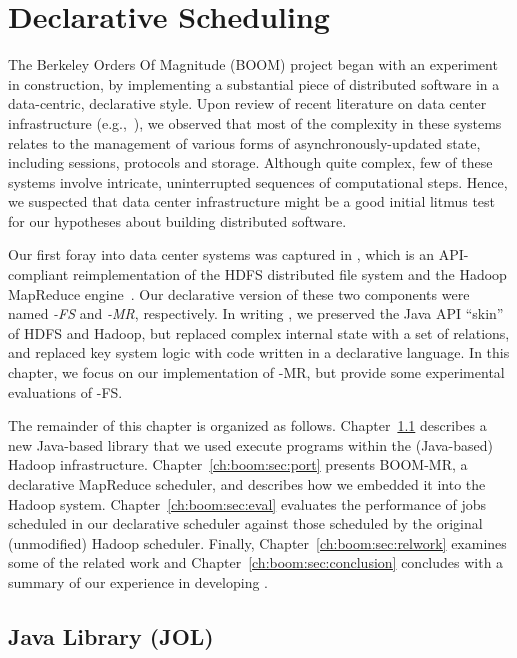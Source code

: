 \chapter[Declarative Scheduling]{Declarative Scheduling}
\label{ch:boom}

The Berkeley Orders Of Magnitude (BOOM) project began with an experiment in
construction, by implementing a substantial piece of distributed software in a
data-centric, declarative style.  Upon review of recent literature on
data center infrastructure (e.g.,~\cite{chubby,gfs-sosp,dynamo,mapreduce-osdi}),
we observed that most of the complexity in these systems relates to the
management of various forms of asynchronously-updated state, including
sessions, protocols and storage.  Although quite complex, few of these systems
involve intricate, uninterrupted sequences of computational steps.  Hence, we
suspected that data center infrastructure might be a good initial litmus test
for our hypotheses about building distributed software.

Our first foray into data center systems was captured in \emph{\BOOMA}, which
is an API-compliant reimplementation of the HDFS distributed file system and
the Hadoop MapReduce engine~\cite{boom}.  Our declarative version of these two
components were named \emph{\BOOM-FS} and \emph{\BOOM-MR}, respectively.  In
writing \BOOMA, we preserved the Java API ``skin'' of HDFS and Hadoop, but
replaced complex internal state with a set of relations, and replaced key
system logic with code written in a declarative language.  In this chapter, we
focus on our implementation of \BOOM-MR, but provide some experimental
evaluations of \BOOM-FS.

The remainder of this chapter is organized as follows.
Chapter~\ref{ch:boom:sec:jol} describes a new Java-based \OVERLOG library that
we used execute \OVERLOG programs within the (Java-based) Hadoop
infrastructure.  Chapter~\ref{ch:boom:sec:port} presents BOOM-MR, a declarative
MapReduce scheduler, and describes how we embedded it into the Hadoop system.
Chapter~\ref{ch:boom:sec:eval} evaluates the performance of jobs scheduled in
our declarative scheduler against those scheduled by the original (unmodified)
Hadoop scheduler.  Finally, Chapter~\ref{ch:boom:sec:relwork} examines some of
the related work and Chapter~\ref{ch:boom:sec:conclusion} concludes with a
summary of our experience in developing \BOOMA.

\section{Java \OVERLOG Library (JOL)}
\label{ch:boom:sec:jol}

